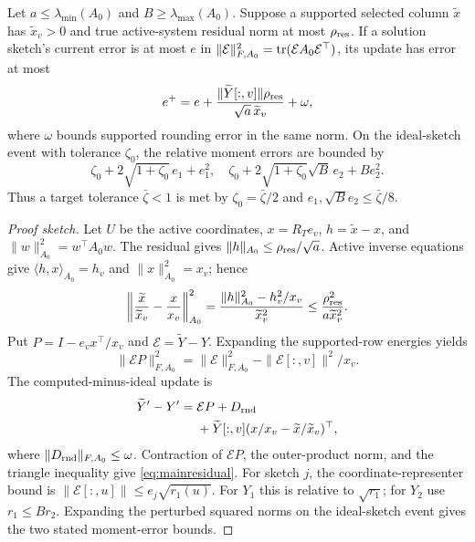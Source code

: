 \begin{proposition}\label{main:residual}
Let $a\leq\lambda_{\min}(A_0)$ and
$B\geq\lambda_{\max}(A_0)$. Suppose a supported selected column
$\widetilde x$ has $\widetilde x_v>0$ and true active-system
residual norm at most $\rho_{\rm res}$. If a solution sketch's current error is at most
$e$ in $\|\mathcal E\|_{F,A_0}^2=\operatorname{tr}(\mathcal E A_0\mathcal E^\top)$, its update has error
at most
\begin{equation}\label{eq:mainresidual}
 e^+=e+\frac{\|\widetilde Y[:,v]\|\rho_{\rm res}}
                   {\sqrt a\,\widetilde x_v}+\omega,
\end{equation}
where $\omega$ bounds supported rounding error in the same norm.
On the ideal-sketch event with tolerance $\zeta_0$, the relative
moment errors are bounded by
\[
 \zeta_0+2\sqrt{1+\zeta_0}\,e_1+e_1^2,
 \quad
 \zeta_0+2\sqrt{1+\zeta_0}\sqrt B\,e_2+B e_2^2.
\]
Thus a target tolerance $\bar\zeta<1$ is met by
$\zeta_0=\bar\zeta/2$ and
$e_1,\sqrt B e_2\leq\bar\zeta/8$.
\end{proposition}
\begin{proof}[Proof sketch]
Let $U$ be the active coordinates, $x=R_Te_v$,
$h=\widetilde x-x$, and $\|w\|_{A_0}^2=w^\top A_0w$.
The residual gives $\|h\|_{A_0}\leq\rho_{\rm res}/\sqrt a$.
Active inverse equations give
$\langle h,x\rangle_{A_0}=h_v$ and $\|x\|_{A_0}^2=x_v$; hence
\[
 \left\|\frac{\widetilde x}{\widetilde x_v}-\frac{x}{x_v}\right\|_{A_0}^2
 =\frac{\|h\|_{A_0}^2-h_v^2/x_v}{\widetilde x_v^2}
 \leq\frac{\rho_{\rm res}^2}{a\widetilde x_v^2}.
\]
Put $P=I-e_vx^\top/x_v$ and $\mathcal E=\widetilde Y-Y$.
Expanding the supported-row energies yields
\[
 \|\mathcal E P\|_{F,A_0}^2
 =\|\mathcal E\|_{F,A_0}^2-\|\mathcal E[:,v]\|^2/x_v.
\]
The computed-minus-ideal update is
\begin{align*}
 \widetilde Y'-Y'={}&\mathcal E P+D_{\rm rnd}\\
 &+\widetilde Y[:,v]
       (x/x_v-\widetilde x/\widetilde x_v)^\top,
\end{align*}
where $\|D_{\rm rnd}\|_{F,A_0}\leq\omega$.
Contraction of $\mathcal E P$, the outer-product norm, and the
triangle inequality give \eqref{eq:mainresidual}.
For sketch $j$, the coordinate-representer bound is
$\|\mathcal E[:,u]\|\leq e_j\sqrt{r_1(u)}$.
For $Y_1$ this is relative to $\sqrt{r_1}$; for $Y_2$ use
$r_1\leq Br_2$. Expanding the perturbed squared norms on the
ideal-sketch event gives the two stated moment-error bounds.
\end{proof}

